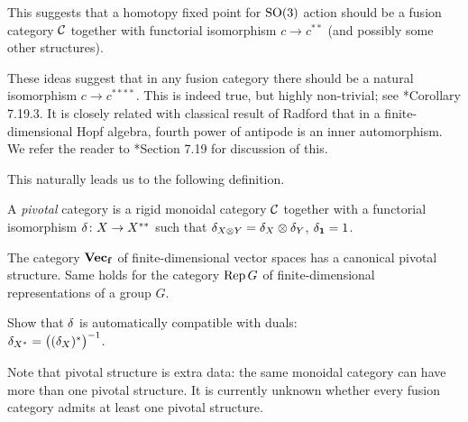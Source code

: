 This suggests that a homotopy fixed point for $\mathrm{SO}(3)$ action should be a fusion
category $\mathcal{C}$ together with functorial isomorphism $c\to c^{**}$ (and
possibly some other structures).

\begin{remark}\label{r:radford}
  These ideas suggest that in any fusion category there should be a natural
  isomorphism $c\to c^{****}$. This is indeed true, but highly non-trivial; see
  *{Corollary 7.19.3}. It is closely related with
  classical result of Radford that in a finite-dimensional Hopf algebra, fourth
  power of antipode is an inner automorphism. We refer the reader to
  *{Section 7.19} for discussion of this.
\end{remark}

This naturally leads us to the following definition.

\begin{definition}\label{d:pivotal}
  A \emph{pivotal} category is a rigid monoidal category $\mathcal{C}$ together with a
  functorial isomorphism $\delta\colon X\to X^{**}$ such that $\delta_{X\otimes Y} =
  \delta_X \otimes \delta_Y$, $\delta_{\mathbf{1}}=1$.
\end{definition}

\begin{example}\label{x:vecf-pivotal}
  The category $\mathbf{Vec_f}$ of finite-dimensional vector spaces has a canonical
  pivotal structure. Same holds for the category $\operatorname{Rep} G$ of finite-dimensional
  representations of a group $G$.
\end{example}

\begin{exercise}\label{ec:pivotal-duals-compatible}
  Show that $\delta$ is automatically compatible with duals:\\
  $\delta_{X^*}=\bigl((\delta_X)^*\bigr)^{-1}$.
\end{exercise}

Note that pivotal structure is extra data: the same monoidal category can have
more than one pivotal structure. It is currently unknown whether every fusion
category admits at least one pivotal structure.


